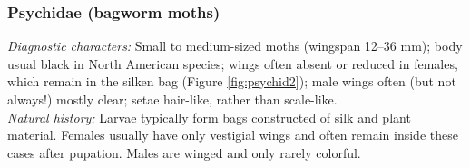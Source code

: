 \documentclass[letterpaper, 11pt]{article}
\begin{document}




\subsubsection{Psychidae (bagworm moths)}
\noindent{}\textit{Diagnostic characters:} Small to medium-sized moths (wingspan 12--36 mm); body usual black in North American species; wings often absent or reduced in females, which remain in the silken bag (Figure \ref{fig:psychid2}); male wings often (but not always!) mostly clear; setae hair-like, rather than scale-like.\\

\noindent{}\textit{Natural history:} Larvae typically form bags constructed of silk and plant material. Females usually have only vestigial wings and often remain inside these cases after pupation. Males are winged and only rarely colorful.
\end{document}
